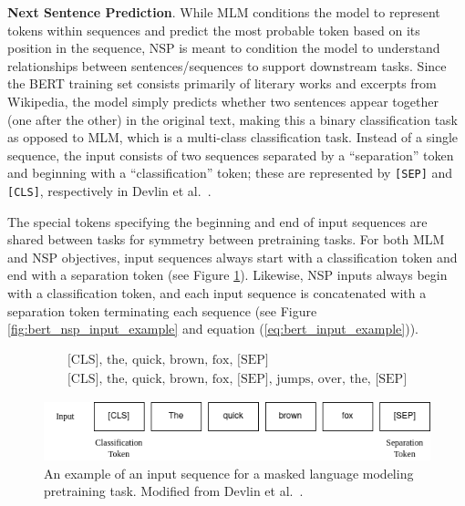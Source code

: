 \documentclass[12pt]{article}
\begin{document}
\textbf{Next Sentence Prediction}. While MLM conditions the model to represent tokens within sequences and predict the most probable token based on
its position in the sequence, NSP is meant to condition the model to understand relationships between sentences/sequences to support downstream tasks.
Since the BERT training set consists primarily of literary works and excerpts from Wikipedia, the model simply predicts whether two sentences appear
together (one after the other) in the original text, making this a binary classification task as opposed to MLM, which is a multi-class classification
task. Instead of a single sequence, the input consists of two sequences separated by a ``separation'' token and beginning with a ``classification''
token; these are represented by \lstinline|[SEP]| and \lstinline|[CLS]|, respectively in Devlin et al.~\cite{devlin_bert_2019}.

The special tokens specifying the beginning and end of input sequences are shared between tasks for symmetry between pretraining tasks. For both MLM
and NSP objectives, input sequences always start with a classification token and end with a separation token (see Figure
\ref{fig:bert_mlm_input_example}). Likewise, NSP inputs always begin with a classification token, and each input sequence is concatenated with a
separation token terminating each sequence (see Figure \ref{fig:bert_nsp_input_example} and equation (\ref{eq:bert_input_example})).

\begin{equation}\label{eq:bert_input_example}
    \begin{gathered}
        \mbox{[CLS], the, quick, brown, fox, [SEP]}\\
        \mbox{[CLS], the, quick, brown, fox, [SEP], jumps, over, the, [SEP]}
    \end{gathered}
\end{equation}

\begin{figure}
    \includegraphics[width=\linewidth]{figures/BERT_MLM_input.png}
    \caption{An example of an input sequence for a masked language modeling pretraining task. Modified from Devlin et al.~\cite{devlin_bert_2019}.}
    \label{fig:bert_mlm_input_example}
\end{figure}
\end{document}

